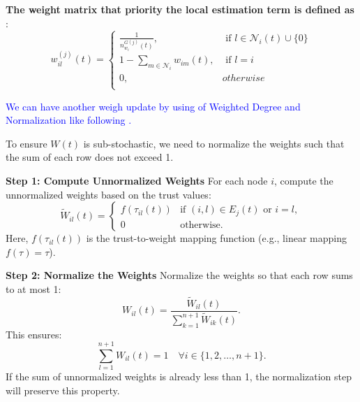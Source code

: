 \documentclass[letterpaper, 10pt, conference]{ieeeconf}  %
\begin{document}
\textbf{ The  weight matrix that priority the local estimation term is defined as }:
\begin{equation}\label{weight_0}
w_{i l}^{(j)}(t)= \begin{cases}
\frac{1}{n_{w_i}^{G(j)}(t)}, & \text { if } l \in \mathcal{N}_i(t) \cup\{0\} \\ 
1-\sum_{m \in \mathcal{N}_i} w_{i m}(t), & \text { if } l=i \\
0, & otherwise \\ 
\end{cases}
\end{equation}

\textcolor{blue}{We can have another weigh update by using of Weighted Degree and Normalization like following .}


To ensure \( W(t) \) is sub-stochastic, we need to normalize the weights such that the sum of each row does not exceed 1.

\textbf{Step 1: Compute Unnormalized Weights}
For each node \( i \), compute the unnormalized weights based on the trust values:
\[
\tilde{W}_{il}(t) = \begin{cases}
f(\tau_{il}(t)) & \text{if } (i, l) \in E_j(t) \text{ or } i = l, \\
0 & \text{otherwise}.
\end{cases}
\]
Here, \( f(\tau_{il}(t)) \) is the trust-to-weight mapping function (e.g., linear mapping \( f(\tau) = \tau \)).

\textbf{Step 2: Normalize the Weights}
Normalize the weights so that each row sums to at most 1:
\[
W_{il}(t) = \frac{\tilde{W}_{il}(t)}{\sum_{k=1}^{n+1} \tilde{W}_{ik}(t)}.
\]
This ensures:
\[
\sum_{l=1}^{n+1} W_{il}(t) = 1 \quad \forall i \in \{1, 2, \dots, n+1\}.
\]
If the sum of unnormalized weights is already less than 1, the normalization step will preserve this property.



\end{document}
